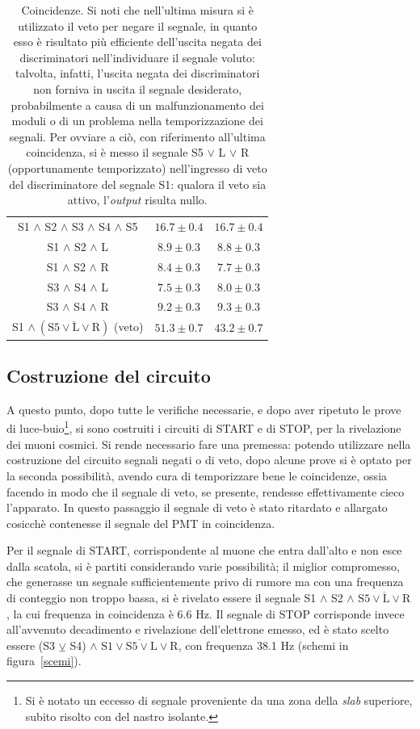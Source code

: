 \documentclass[10pt, oneside, a4paper]{article}   	%
\begin{document}
\begin{table}[H]
\begin{tabular}{ccc}
		S1 $\wedge$ S2 $\wedge$ S3 $\wedge$ S4 $\wedge$ S5	& $16.7 \pm 0.4$	& $16.7 \pm 0.4$ \\	
		S1 $\wedge$ S2 $\wedge$ L				& $8.9 \pm 0.3$		& $8.8 \pm 0.3$	\\
		S1 $\wedge$ S2 $\wedge$ R				& $8.4 \pm 0.3$		& $7.7 \pm 0.3$	\\
		S3 $\wedge$ S4 $\wedge$ L				& $7.5 \pm 0.3$		& $8.0 \pm 0.3$	\\
		S3 $\wedge$ S4 $\wedge$ R				& $9.2 \pm 0.3$ 	& $9.3 \pm 0.3$	\\
		S1 $\wedge \ (\overline{\mbox{S5}\vee \mbox{L} \vee \mbox{R}})$ (veto)	& $51.3 \pm 0.7$	& $43.2 \pm 0.7$	\\
		\bottomrule
	\end{tabular}
	\caption{Coincidenze. 
	Si noti che nell'ultima misura si è utilizzato il veto per negare il segnale, in quanto esso è risultato più efficiente dell'uscita negata dei discriminatori nell'individuare il segnale voluto: talvolta, infatti, l'uscita negata dei discriminatori non forniva in uscita il segnale desiderato, probabilmente a causa di un malfunzionamento dei moduli o di un problema nella temporizzazione dei segnali. Per ovviare a ciò, con riferimento all'ultima coincidenza, si è messo il segnale S5 $\vee$ L $\vee$ R (opportunamente temporizzato) nell'ingresso di veto del discriminatore del segnale S1: qualora il veto sia attivo, l'\textit{output} risulta nullo.}
	\label{coincidenze}
\end{table}
%
\subsection{Costruzione del circuito}\label{circuito}
A questo punto, dopo tutte le verifiche necessarie, e dopo aver ripetuto le prove di luce-buio\footnote{Si è notato un eccesso di segnale proveniente da una zona della \emph{slab} superiore, subito risolto con del nastro isolante.}, si sono costruiti i circuiti di START e di STOP, per la rivelazione dei muoni cosmici. Si rende necessario fare una premessa: potendo utilizzare nella costruzione del circuito segnali negati o di veto, dopo alcune prove si è optato per la seconda possibilità, avendo cura di temporizzare bene le coincidenze, ossia facendo in modo che il segnale di veto, se presente, rendesse effettivamente cieco l'apparato. In questo passaggio il segnale di veto è stato ritardato e allargato cosicchè contenesse il segnale del PMT in coincidenza.

Per il segnale di START, corrispondente al muone che entra dall'alto e non esce dalla scatola, si è partiti considerando varie possibilità; il miglior compromesso, che generasse un segnale sufficientemente privo di rumore ma con una frequenza di conteggio non troppo bassa, si è rivelato essere il segnale S1 $\wedge$ S2  $\wedge$ $\overline{\mbox{S5}\vee \mbox{L} \vee \mbox{R}}$ , la cui frequenza in coincidenza è 6.6 Hz.
Il segnale di STOP corrisponde invece all'avvenuto decadimento e rivelazione dell'elettrone emesso, ed è stato scelto essere (S3 $\veebar$ S4)  $\wedge$ $\overline{\mbox{S1} \vee \mbox{S5}\vee \mbox{L} \vee \mbox{R}}$, con frequenza 38.1 Hz (schemi in figura~\ref{scemi}).
\end{document}
